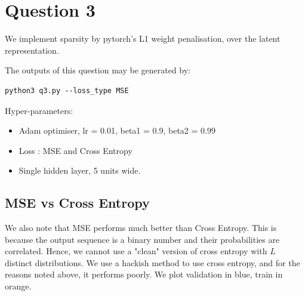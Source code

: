 \section{Question 3}

We implement sparsity by pytorch's L1 weight penalisation, over the latent representation.

The outputs of this question may be generated by:

\begin{lstlisting}
python3 q3.py --loss_type MSE
\end{lstlisting} 

Hyper-parameters:
\begin{itemize}
\item  Adam optimiser, lr = 0.01, beta1 = 0.9, beta2 = 0.99
\item  Loss : MSE and Cross Entropy
\item  Single hidden layer, 5 units wide.
\end{itemize}

\subsection{MSE vs Cross Entropy}

We also note that MSE performs much better than Cross Entropy. This is because the output sequence is a binary number and their probabilities are correlated. Hence, we cannot use a "clean" version of cross entropy with $L$ distinct distributions. We use a hackish method to use cross entropy, and for the reasons noted above, it performs poorly. We plot validation in blue, train in orange.

